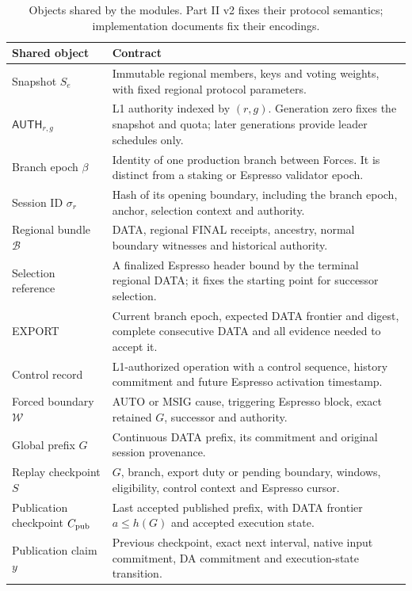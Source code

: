 \documentclass[11pt,a4paper]{article}
\newcommand{\api}[1]{\ensuremath{\mathsf{#1}}}
\begin{document}
\begin{table}[H]\centering\small
\begin{tabularx}{\linewidth}{@{}p{.26\linewidth}Y@{}}
\toprule Shared object & Contract\\\midrule
Snapshot $S_e$ & Immutable regional members, keys and voting weights,
with fixed regional protocol parameters.\\
$\api{AUTH}_{r,g}$ & L1 authority indexed by $(r,g)$.
Generation zero fixes the snapshot and quota; later generations provide
leader schedules only.\\
Branch epoch $\beta$ & Identity of one production branch between Forces.
It is distinct from a staking or Espresso validator epoch.\\
Session ID $\sigma_r$ & Hash of its opening boundary, including the branch
epoch, anchor, selection context and authority.\\
Regional bundle $\mathcal B$ & DATA, regional FINAL receipts, ancestry,
normal boundary witnesses and historical authority.\\
Selection reference & A finalized Espresso header bound by the terminal
regional DATA; it fixes the starting point for successor selection.\\
EXPORT & Current branch epoch, expected DATA frontier and digest, complete
consecutive DATA and all evidence needed to accept it.\\
Control record & L1-authorized operation with a control sequence,
history commitment and future Espresso activation timestamp.\\
Forced boundary $\mathcal W$ & AUTO or MSIG cause, triggering Espresso
block, exact retained $G$, successor and authority.\\
Global prefix $G$ & Continuous DATA prefix, its commitment and original
session provenance.\\
Replay checkpoint $S$ & $G$, branch, export duty or pending boundary,
windows, eligibility, control context and Espresso cursor.\\
Publication checkpoint $C_{\rm pub}$ & Last accepted published prefix,
with DATA frontier $a\le h(G)$ and accepted execution state.\\
Publication claim $y$ & Previous checkpoint, exact next interval, native
input commitment, DA commitment and execution-state transition.\\\bottomrule
\end{tabularx}
\caption{Objects shared by the modules. Part II v2 fixes their protocol
semantics; implementation documents fix their encodings.}
\end{table}
\end{document}

